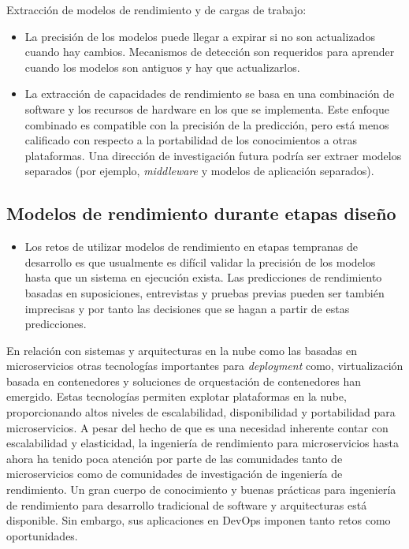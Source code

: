 \documentclass[11pt, twoside]{report}
\begin{document}
Extracción de modelos de rendimiento y de cargas de trabajo:
\begin{itemize}
    \item La precisión de los modelos puede llegar a expirar si no son actualizados cuando hay cambios. Mecanismos de detección son requeridos para aprender cuando los modelos son antiguos y hay que actualizarlos.
    \item La extracción de capacidades de rendimiento se basa en una combinación de software y los recursos de hardware en los que se implementa. Este enfoque combinado es compatible con la precisión de la predicción, pero está menos calificado con respecto a la portabilidad de los conocimientos a otras plataformas. Una dirección de investigación futura podría ser extraer modelos separados (por ejemplo, \emph{middleware} y modelos de aplicación separados). 
\end{itemize}

\subsection{Modelos de rendimiento durante etapas diseño }
\begin{itemize}
    \item Los retos de utilizar modelos de rendimiento en etapas tempranas de desarrollo es que usualmente es difícil validar la precisión de los modelos hasta que un sistema en ejecución exista. Las predicciones de rendimiento basadas en suposiciones, entrevistas y pruebas previas pueden ser también imprecisas y por tanto las decisiones que se hagan a partir de estas predicciones.
\end{itemize}

En relación con sistemas y arquitecturas en la nube como las basadas en microservicios otras tecnologías importantes para \emph{deployment} como, virtualización basada en contenedores y soluciones de orquestación de contenedores han emergido. Estas tecnologías permiten explotar plataformas en la nube, proporcionando altos niveles de escalabilidad, disponibilidad y portabilidad para microservicios. A pesar del hecho de que es una necesidad inherente contar con escalabilidad y elasticidad, la ingeniería de rendimiento para microservicios hasta ahora ha tenido poca atención por parte de las comunidades tanto de microservicios como de comunidades de investigación de ingeniería de rendimiento\cite{microservices-challenges}. Un gran cuerpo de conocimiento y buenas prácticas para ingeniería de rendimiento para desarrollo tradicional de software y arquitecturas está disponible. Sin embargo, sus aplicaciones en DevOps imponen tanto retos como oportunidades.
\end{document}
